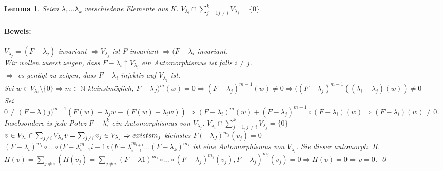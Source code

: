 \documentclass{report}
\newcommand{\lb}{\lambda}
\newcommand{\N}{\mathbb{N}}
\theoremstyle{customrem}
\theoremstyle{customdef}
\newtheorem{lemma}[definition]{Lemma}
\renewenvironment{proof}{\paragraph{Beweis: }}{\qed}
\theoremstyle{customenv}
\begin{document}
\begin{lemma}
  Seien \(\lb_1 \dots \lb_k\) verschiedene Elemente aus K.
  \(V_{\lb_i} \cap \sum_{j=1 j\neq i}^k V_{\lb_j} = \{0\}\).
  \begin{proof}
    \(V_{\lb_j} = (F - \lb_j)\) invariant \(\Rightarrow V_{\lb_j}\) ist
    F-invariant \(\Rightarrow (F-\lb_i\) invariant.\\
    Wir wollen zuerst zeigen, dass  \(F - \lb_i \uparrow V_{\lb_j}\) ein
    Automorphismus ist falls \(i \neq j\).\\
    \(\Rightarrow\) es gen\"ugt zu zeigen, dass \(F - \lb_i\) injektiv auf
    \(V_{\lb_j}\) ist.\\
    Sei \(w \in V_{\lb_j} \setminus \{0\} \Rightarrow m \in \N\) kleinstm\"oglich,
    \(F - \lb_J)^m(w) = 0 \Rightarrow (F - \lb_j)^{m - 1}(w) \neq 0
    \Rightarrow ((F - \lb_j)^{m-1}((\lb_i - \lb_j)(w)) \neq 0\)\\
    Sei \(0 \neq (F - \lb)j)^{m-1}(F(w) - \lb_j w - (F(w) - \lb_i w))
    \Rightarrow (F - \lb_i)^m(w) + (F - \lb_j)^{m-1} \circ (F - \lb_i)(w)
    \Rightarrow (F- \lb_i)(w) \neq 0\).\\
    Insebsondere is jede Potez \(F - \lb_i^k\) ein Automorphismus von
    \(V_{\lb_j}\). \(V_{\lb_i} \cap \sum_{j=1, j\neq i}^k V_{\lb_j} = \{0\}\)
    \(v \in V_{\lb_i} \cap \sum_{j \neq i} V_{\lb_j}\\
    v = \sum_{j \neq i} v_j \in V_{\lb_j}
    \Rightarrow exist sm_j\) kleinstes \(F( - \lb_J)^{m_j}(v_j) = 0\)\\
    \((F - \lb_i)^{m_i} \circ \dots \circ (F - \lb_{i - 1}^{m}{i-1} \circ
    (F - \lb_{i-1}^{m_{i+1}} \dots (F - \lb_{k})^{m_k}\) ist eine Automorphismus
    von \(V_{\lb_i}\). Sie dieser automorph. H. \(H(v) = \sum_{j \neq i}(H(v_j)
    = \sum_{j \neq i} (F - \lb1)^{m_1} \circ \dots \circ (F - \lb_j)^{m_j}(v_j), F - \lb_j)^{m_j}(v_j) = 0
    \Rightarrow H(v) = 0 \Rightarrow v = 0\).
    \end{proof}
\end{lemma}
\end{document}
